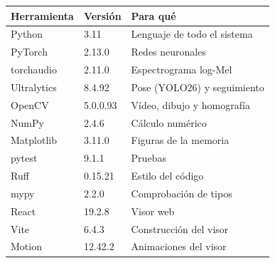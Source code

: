 \begin{tabular}{lll}
\toprule
\textbf{Herramienta} & \textbf{Versión} & \textbf{Para qué} \\
\midrule
Python & 3.11 & Lenguaje de todo el sistema \\
PyTorch~\cite{paszke2019pytorch} & 2.13.0 & Redes neuronales \\
torchaudio~\cite{yang2022torchaudio} & 2.11.0 & Espectrograma log-Mel \\
Ultralytics~\cite{jocher2026yolo26} & 8.4.92 & Pose (YOLO26) y seguimiento \\
OpenCV~\cite{bradski2000opencv} & 5.0.0.93 & Vídeo, dibujo y homografía \\
NumPy~\cite{harris2020numpy} & 2.4.6 & Cálculo numérico \\
Matplotlib~\cite{hunter2007matplotlib} & 3.11.0 & Figuras de la memoria \\
pytest & 9.1.1 & Pruebas \\
Ruff & 0.15.21 & Estilo del código \\
mypy & 2.2.0 & Comprobación de tipos \\
\midrule
React & 19.2.8 & Visor web \\
Vite & 6.4.3 & Construcción del visor \\
Motion & 12.42.2 & Animaciones del visor \\
\bottomrule
\end{tabular}

